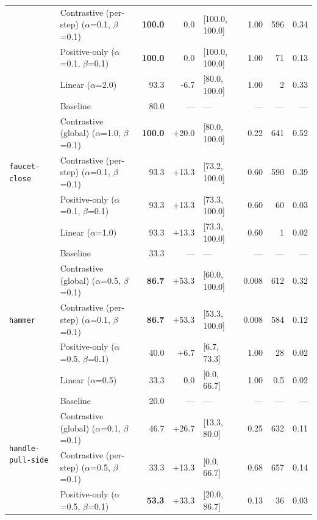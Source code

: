 \begin{table}[p]
{\begin{tabular}{@{}ll r r l r r r@{}}
   & Contrastive (per-step) \scriptsize{($\alpha$=0.1, $\beta$=0.1)} & \textbf{100.0} & 0.0 & [100.0, 100.0] & 1.00 & 596 & 0.34 \\
   & Positive-only \scriptsize{($\alpha$=0.1, $\beta$=0.1)} & \textbf{100.0} & 0.0 & [100.0, 100.0] & 1.00 & 71 & 0.13 \\
   & Linear \scriptsize{($\alpha$=2.0)} & 93.3 & -6.7 & [80.0, 100.0] & 1.00 & 2 & 0.33 \\
\midrule
  \multirow{5}{*}{\texttt{faucet-close}} & Baseline & 80.0 & --- & --- & --- & --- & --- \\
   & Contrastive (global) \scriptsize{($\alpha$=1.0, $\beta$=0.1)} & \textbf{100.0} & +20.0 & [80.0, 100.0] & 0.22 & 641 & 0.52 \\
   & Contrastive (per-step) \scriptsize{($\alpha$=0.1, $\beta$=0.1)} & 93.3 & +13.3 & [73.2, 100.0] & 0.60 & 590 & 0.39 \\
   & Positive-only \scriptsize{($\alpha$=0.1, $\beta$=0.1)} & 93.3 & +13.3 & [73.3, 100.0] & 0.60 & 60 & 0.03 \\
   & Linear \scriptsize{($\alpha$=1.0)} & 93.3 & +13.3 & [73.3, 100.0] & 0.60 & 1 & 0.02 \\
\midrule
  \multirow{5}{*}{\texttt{hammer}} & Baseline & 33.3 & --- & --- & --- & --- & --- \\
   & Contrastive (global) \scriptsize{($\alpha$=0.5, $\beta$=0.1)} & \textbf{86.7} & +53.3 & [60.0, 100.0] & 0.008 & 612 & 0.32 \\
   & Contrastive (per-step) \scriptsize{($\alpha$=0.1, $\beta$=0.1)} & \textbf{86.7} & +53.3 & [53.3, 100.0] & 0.008 & 584 & 0.12 \\
   & Positive-only \scriptsize{($\alpha$=0.5, $\beta$=0.1)} & 40.0 & +6.7 & [6.7, 73.3] & 1.00 & 28 & 0.02 \\
   & Linear \scriptsize{($\alpha$=0.5)} & 33.3 & 0.0 & [0.0, 66.7] & 1.00 & 0.5 & 0.02 \\
\midrule
  \multirow{5}{*}{\texttt{handle-pull-side}} & Baseline & 20.0 & --- & --- & --- & --- & --- \\
   & Contrastive (global) \scriptsize{($\alpha$=0.1, $\beta$=0.1)} & 46.7 & +26.7 & [13.3, 80.0] & 0.25 & 632 & 0.11 \\
   & Contrastive (per-step) \scriptsize{($\alpha$=0.5, $\beta$=0.1)} & 33.3 & +13.3 & [0.0, 66.7] & 0.68 & 657 & 0.14 \\
   & Positive-only \scriptsize{($\alpha$=0.5, $\beta$=0.1)} & \textbf{53.3} & +33.3 & [20.0, 86.7] & 0.13 & 36 & 0.03 \\

\end{tabular}}
\end{table}
